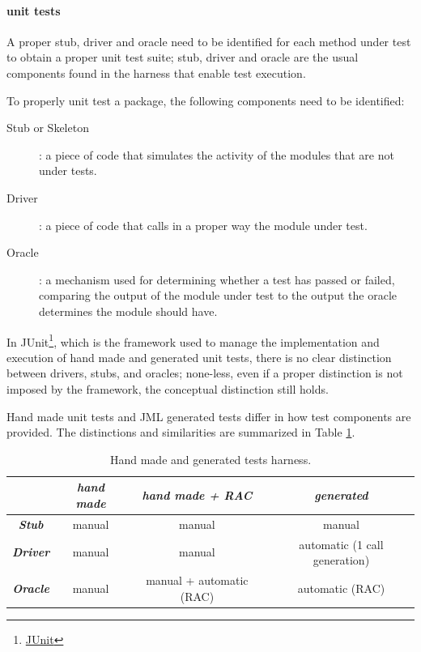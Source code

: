 \documentclass[english]{lni}
\newcommand{\myhref}[2]{\ifpdf\href{#1}{#2}\else\htmladdnormallinkfoot{#2}{#1}\fi}
\begin{document}
\paragraph{unit tests}

A proper stub, driver and oracle need to be identified for each method under test to obtain a proper unit test suite; stub, driver and oracle are the usual components found in the harness that enable test execution\cite{Binder1999}.  

To properly unit test a package, the following components need to be identified:
\begin{description}
\item[Stub or Skeleton]: a piece of code that simulates the activity of the modules that are not under tests.
\item[Driver]: a piece of code that calls in a proper way the module under test.
\item[Oracle]: a mechanism used for determining whether a test has passed or failed, comparing the output of the module under test to the output the oracle determines the module should have.
\end{description}

In JUnit\footnote{\myhref{http://www.junit.org/}{JUnit}}, which is the framework used to manage the implementation and execution of hand made and generated unit tests, there is no clear distinction between drivers, stubs, and oracles; none-less, even if a proper distinction
is not imposed by the framework, the conceptual distinction still holds.

Hand made unit tests and JML generated tests differ in how test components are provided.
The distinctions and similarities are summarized in Table \ref{tab:test_harness}.
\begin{table}[htbp]
  \caption{Hand made and generated tests harness.}
  \label{tab:test_harness}
  \begin{center}
    \begin{tabular}{|c|c|c|c|}\hline
       & \textbf{\textit{hand made}} & \textbf{\textit{hand made + RAC}} & \textbf{\textit{generated}} \\\hline
      \textbf{\textit{Stub}} & manual & manual & manual\\\hline
      \textbf{\textit{Driver}} & manual & manual & automatic (1 call generation)\\\hline
      \textbf{\textit{Oracle}} & manual & manual + automatic (RAC) & automatic (RAC)\\\hline
    \end{tabular}
  \end{center}
\end{table}
\end{document}
